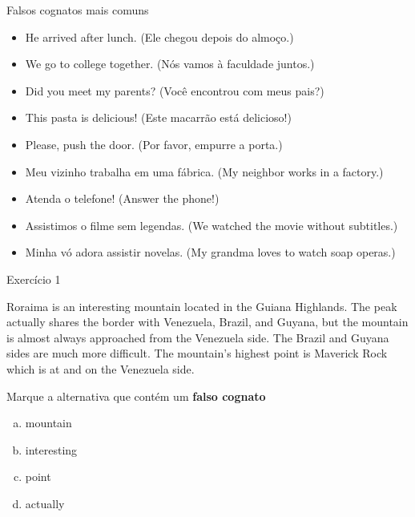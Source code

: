 \documentclass[compress,mathserif]{beamer}
\begin{document}
\begin{frame}{Falsos cognatos mais comuns}

\begin{itemize}
    \item He arrived after lunch. (Ele chegou depois do almoço.)
    \item We go to college together. (Nós vamos à faculdade juntos.)
    \item Did you meet my parents? (Você encontrou com meus pais?)
    \item This pasta is delicious! (Este macarrão está delicioso!)
    \item Please, push the door. (Por favor, empurre a porta.)
\end{itemize}

\vspace{0.5cm}

\begin{itemize}
    \item Meu vizinho trabalha em uma fábrica. (My neighbor works in a factory.)
    \item Atenda o telefone! (Answer the phone!)
    \item Assistimos o filme sem legendas. (We watched the movie without subtitles.)
    \item Minha vó adora assistir novelas. (My grandma loves to watch soap operas.)
\end{itemize}

\vspace{0.5cm}

\centering \href{https://www.sk.com.br/sk-falsos-cognatos-ou-falsos-amigos.html}{} \hspace{1cm}
\href{https://www.todamateria.com.br/falsos-cognatos-no-ingles-false-friends/}{}

\end{frame}


\begin{frame}{Exercício 1}

Roraima is an interesting mountain located in the Guiana Highlands. The peak actually shares the border with Venezuela, Brazil, and Guyana, but the mountain is almost always approached from the Venezuela side. The Brazil and Guyana sides are much more difficult. The mountain’s highest point is Maverick Rock which is at and on the Venezuela side.

Marque a alternativa que contém um \textbf{falso cognato}

\begin{enumerate}[a)]
    \item mountain
    \item interesting
    \item point
    \item actually
\end{enumerate}

\end{frame}
\end{document}
